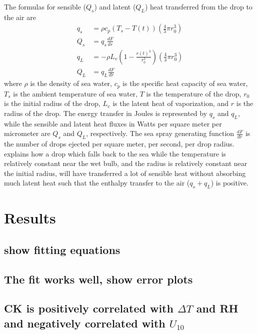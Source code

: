 \documentclass[10pt,a4paper]{article}
\begin{document}
The formulas for sensible ($Q_s$) and latent ($Q_L$) heat transferred from the drop to the air are
\begin{align}
q_s &= \rho c_p \left(T_s - T(t)\right)\left(\frac{4}{3}\pi r_0^3\right)\\
Q_s &= q_s \frac{dF}{dr}\label{eq:Qs}\\
q_L &= -\rho L_v \left(1 - \frac{r(t)^3}{r_0^3}\right)\left(\frac{4}{3}\pi r_0^3\right)\\
Q_L &= q_L \frac{dF}{dr}\label{eq:QL}
\end{align}
where $\rho$ is the density of sea water, $c_p$ is the specific heat capacity of sea water, $T_s$ is the ambient temperature of sea water, $T$ is the temperature of the drop, $r_0$ is the initial radius of the drop, $L_v$ is the latent heat of vaporization, and $r$ is the radius of the drop. The energy transfer in Joules is represented by $q_s$ and $q_L$, while the sensible and latent heat fluxes in Watts per square meter per micrometer are $Q_s$ and $Q_L$, respectively. The sea spray generating function $\frac{dF}{dr}$ is the number of drops ejected per square meter, per second, per drop radius. \citet{Andreas2001} explains how a drop which falls back to the sea while the temperature is relatively constant near the wet bulb, and the radius is relatively constant near the initial radius, will have transferred a lot of sensible heat without absorbing much latent heat such that the enthalpy transfer to the air ($q_s+q_L$) is positive.


\section{Results}



\subsection{show fitting equations}

\subsection{The fit works well, show error plots}


\subsection{CK is positively correlated with $\Delta T$ and RH and negatively correlated with $U_{10}$ }
\end{document}
